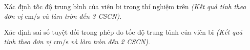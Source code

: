 \begin{ex}
	Xác định tốc độ trung bình của viên bi trong thí nghiệm trên \textit{(Kết quả tính theo đơn vị $\si{\centi\meter/\second}$ và làm tròn đến 3 CSCN)}.
\end{ex}
\begin{ex}
	Xác định sai số tuyệt đối trong phép đo tốc độ trung bình của viên bi \textit{(Kết quả tính theo đơn vị $\si{\centi\meter/\second}$ và làm tròn đến 2 CSCN)}.
\end{ex}
